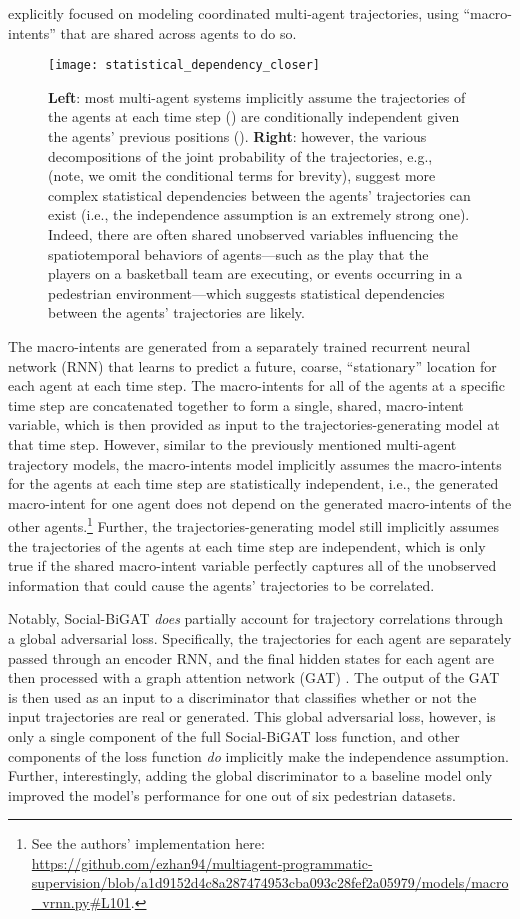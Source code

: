 \documentclass{article}
\begin{document}
\citet{zhan2018generating} explicitly focused on modeling coordinated multi-agent trajectories, using ``macro-intents'' \cite{zheng2016generating} that are shared across agents to do so.
\begin{wrapfigure}{l}{0.6\linewidth}
\texttt{[image: statistical\_dependency\_closer]}
\caption{\textbf{Left}: most multi-agent systems implicitly assume the trajectories of the agents at each time step () are conditionally independent given the agents' previous positions ().
\textbf{Right}: however, the various decompositions of the joint probability of the trajectories, e.g.,  (note, we omit the conditional  terms for brevity), suggest more complex statistical dependencies between the agents' trajectories can exist (i.e., the independence assumption is an extremely strong one).
Indeed, there are often shared unobserved variables influencing the spatiotemporal behaviors of agents—such as the play that the players on a basketball team are executing, or events occurring in a pedestrian environment—which suggests statistical dependencies between the agents' trajectories are likely.
}
\label{fig:ind_dep}
\end{wrapfigure}
The macro-intents are generated from a separately trained recurrent neural network (RNN) that learns to predict a future, coarse, ``stationary'' location for each agent at each time step.
The macro-intents for all of the agents at a specific time step are concatenated together to form a single, shared, macro-intent variable, which is then provided as input to the trajectories-generating model at that time step.
However, similar to the previously mentioned multi-agent trajectory models, the macro-intents model implicitly assumes the macro-intents for the agents at each time step are statistically independent, i.e., the generated macro-intent for one agent does not depend on the generated macro-intents of the other agents.\footnote{See the authors' implementation here: \url{https://github.com/ezhan94/multiagent-programmatic-supervision/blob/a1d9152d4c8a287474953cba093c28fef2a05979/models/macro_vrnn.py\#L101}.}
Further, the trajectories-generating model still implicitly assumes the trajectories of the agents at each time step are independent, which is only true if the shared macro-intent variable perfectly captures all of the unobserved information that could cause the agents' trajectories to be correlated.

Notably, Social-BiGAT \cite{NEURIPS2019_d09bf415} \textit{does} partially account for trajectory correlations through a global adversarial loss.
Specifically, the trajectories for each agent are separately passed through an encoder RNN, and the final hidden states for each agent are then processed with a graph attention network (GAT) \cite{velickovic2018graph}.
The output of the GAT is then used as an input to a discriminator that classifies whether or not the input trajectories are real or generated.
This global adversarial loss, however, is only a single component of the full Social-BiGAT loss function, and other components of the loss function \textit{do} implicitly make the independence assumption.
Further, interestingly, adding the global discriminator to a baseline model only improved the model's performance for one out of six pedestrian datasets.
\end{document}
